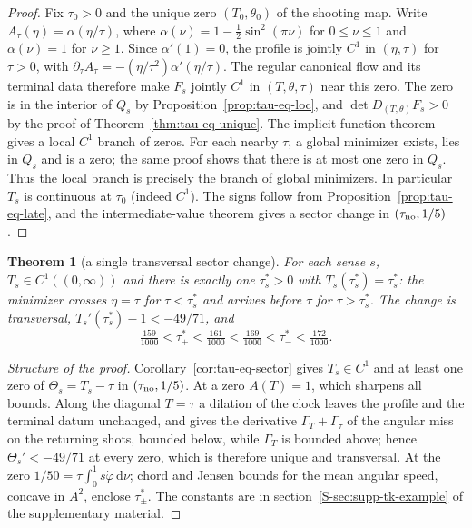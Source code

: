 \documentclass[aip,jmp,amsmath,amssymb,reprint]{revtex4-2}
\newcommand{\dd}{\mathrm{d}}
\theoremstyle{plain}
\newtheorem{theorem}{Theorem}
\theoremstyle{definition}
\begin{document}
\begin{proof}
Fix $\tau_0>0$ and the unique zero $(T_0,\theta_0)$ of the shooting map.
Write $A_\tau(\eta)=\alpha(\eta/\tau)$, where
$\alpha(\nu)=1-\frac12\sin^2(\pi \nu)$ for $0\le \nu\le1$ and $\alpha(\nu)=1$ for $\nu\ge1$.
Since $\alpha'(1)=0$, the profile is jointly $C^1$ in $(\eta,\tau)$ for $\tau>0$,
with $\partial_\tau A_\tau=-(\eta/\tau^2)\alpha'(\eta/\tau)$.
The regular canonical flow and its terminal data therefore make $F_s$
jointly $C^1$ in $(T,\theta,\tau)$ near this zero.
The zero is in the interior of $Q_s$ by Proposition~\ref{prop:tau-eq-loc},
and $\det D_{(T,\theta)}F_s>0$ by the proof of Theorem~\ref{thm:tau-eq-unique}.
The implicit-function theorem gives a local $C^1$ branch of zeros.
For each nearby $\tau$, a global minimizer exists, lies in $Q_s$ and is a zero;
the same proof shows that there is at most one zero in $Q_s$.
Thus the local branch is precisely the branch of global minimizers.
In particular $T_s$ is continuous at $\tau_0$ (indeed $C^1$).
The signs follow from Proposition~\ref{prop:tau-eq-late}, and the intermediate-value
theorem gives a sector change in $(\tau_{\rm no},1/5)$.
\end{proof}

\begin{theorem}[a single transversal sector change]\label{thm:tau-eq-sector}
For each sense $s$, $T_s\in C^1((0,\infty))$ and there is exactly one $\tau_s^*>0$ with $T_s(\tau_s^*)=\tau_s^*$:
the minimizer crosses $\eta=\tau$ for $\tau<\tau_s^*$ and arrives before $\tau$ for $\tau>\tau_s^*$. The change is
transversal, $T_s'(\tau_s^*)-1<-49/71$, and
\[
  \tfrac{159}{1000}<\tau_+^*<\tfrac{161}{1000}<\tfrac{169}{1000}<\tau_-^*<\tfrac{172}{1000}.
\]
\end{theorem}

\begin{proof}[Structure of the proof]
Corollary~\ref{cor:tau-eq-sector} gives $T_s\in C^1$ and at least one zero of $\Theta_s=T_s-\tau$ in
$(\tau_{\rm no},1/5)$. At a zero $A(T)=1$, which sharpens all bounds. Along the diagonal $T=\tau$ a
dilation of the clock leaves the profile and the terminal datum unchanged, and gives the derivative
$\Gamma_T+\Gamma_\tau$ of the angular miss on the returning shots, bounded below, while $\Gamma_T$ is bounded above;
hence $\Theta_s'<-49/71$ at every zero, which is therefore unique and transversal. At the zero
$1/50=\tau\int_0^1s\dot\varphi\,\dd \nu$; chord and Jensen bounds for the mean angular speed, concave in $A^2$,
enclose $\tau_\pm^*$. The constants are in
section~\ref{S-sec:supp-tk-example} of the supplementary material.
\end{proof}
\end{document}
